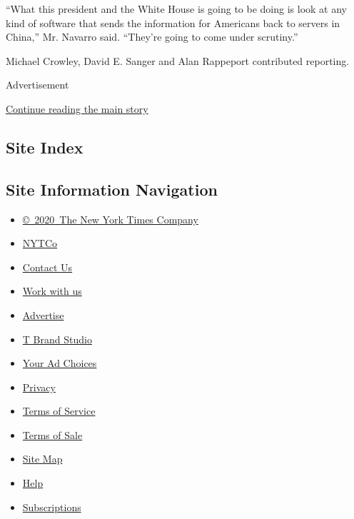 ``What this president and the White House is going to be doing is look
at any kind of software that sends the information for Americans back to
servers in China,'' Mr. Navarro said. ``They're going to come under
scrutiny.''

Michael Crowley, David E. Sanger and Alan Rappeport contributed
reporting.

Advertisement

\protect\hyperlink{after-bottom}{Continue reading the main story}

\hypertarget{site-index}{%
\subsection{Site Index}\label{site-index}}

\hypertarget{site-information-navigation}{%
\subsection{Site Information
Navigation}\label{site-information-navigation}}

\begin{itemize}
\tightlist
\item
  \href{https://help.nytimes3xbfgragh.onion/hc/en-us/articles/115014792127-Copyright-notice}{©~2020~The
  New York Times Company}
\end{itemize}

\begin{itemize}
\tightlist
\item
  \href{https://www.nytco.com/}{NYTCo}
\item
  \href{https://help.nytimes3xbfgragh.onion/hc/en-us/articles/115015385887-Contact-Us}{Contact
  Us}
\item
  \href{https://www.nytco.com/careers/}{Work with us}
\item
  \href{https://nytmediakit.com/}{Advertise}
\item
  \href{http://www.tbrandstudio.com/}{T Brand Studio}
\item
  \href{https://www.nytimes3xbfgragh.onion/privacy/cookie-policy\#how-do-i-manage-trackers}{Your
  Ad Choices}
\item
  \href{https://www.nytimes3xbfgragh.onion/privacy}{Privacy}
\item
  \href{https://help.nytimes3xbfgragh.onion/hc/en-us/articles/115014893428-Terms-of-service}{Terms
  of Service}
\item
  \href{https://help.nytimes3xbfgragh.onion/hc/en-us/articles/115014893968-Terms-of-sale}{Terms
  of Sale}
\item
  \href{https://spiderbites.nytimes3xbfgragh.onion}{Site Map}
\item
  \href{https://help.nytimes3xbfgragh.onion/hc/en-us}{Help}
\item
  \href{https://www.nytimes3xbfgragh.onion/subscription?campaignId=37WXW}{Subscriptions}
\end{itemize}
